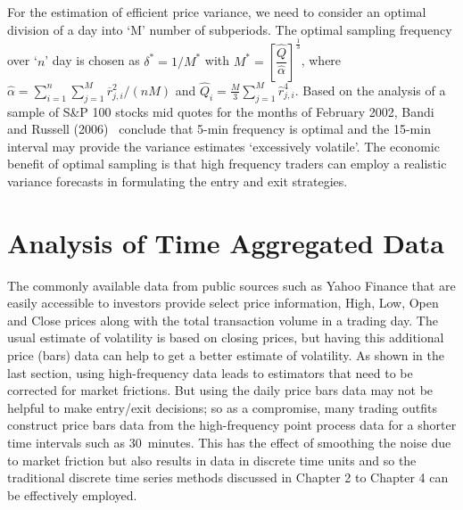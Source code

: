 For the estimation of efficient price variance, we need to consider an  optimal division of a day into `M' number of subperiods. The optimal sampling frequency over `$n$' day is chosen as $\delta^* = 1/M^*$ with $M^*= \left[\dfrac{\hat{Q}}{\hat{\alpha}}\right]^{\frac{1}{3}}$, where $\hat{\alpha} = \sum_{i=1}^n\sum_{j=1}^M\overline{r}_{j,i}^2/(nM)$ and $\hat{Q}_i = \frac{M}{3}\sum_{j=1}^M\hat{r}_{j,i}^4$. Based on the analysis of a sample of S\&P 100 stocks mid quotes for the months of February 2002, Bandi and Russell (2006)~\cite{bandi} conclude that 5-min frequency is optimal and the 15-min interval may provide the variance estimates `excessively volatile'. The economic benefit of optimal sampling is that high frequency traders can employ a realistic variance forecasts in formulating the entry and exit strategies. 




\section{Analysis of Time Aggregated Data}



The commonly available data from public sources such as Yahoo Finance that are easily accessible to investors provide select price information, High, Low, Open and Close prices along with the total transaction volume in a trading day. The usual estimate of volatility is based on closing prices, but having this additional price (bars) data can help to get a better estimate of volatility. As shown in the last section, using high-frequency data leads to estimators that need to be corrected for market frictions. But using the daily price bars data may not be helpful to make entry/exit decisions; so as a compromise, many trading outfits construct price bars data from the high-frequency point process data for a shorter time intervals such as 30~minutes. This has the effect of smoothing the noise due to market friction but also results in data in discrete time units and so the traditional discrete time series methods discussed in Chapter 2 to Chapter 4 can be effectively employed. 


